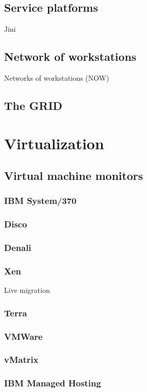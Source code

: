 \subsection{Service platforms}

Jini

\subsection{Network of workstations}
Networks of workstations (NOW)\cite{anderson95a}

\subsection{The GRID}
\cite{zhao}

\section{Virtualization}

\subsection{Virtual machine monitors}
\subsubsection{IBM System/370}
\subsubsection{Disco}
\subsubsection{Denali}
\subsubsection{Xen}
\cite{barham}
Live migration \cite{clark} \cite{sapuntzakis}
\subsubsection{Terra}
\cite{garfinkel}
\subsubsection{VMWare}
\subsubsection{vMatrix}
\subsubsection{IBM Managed Hosting}

